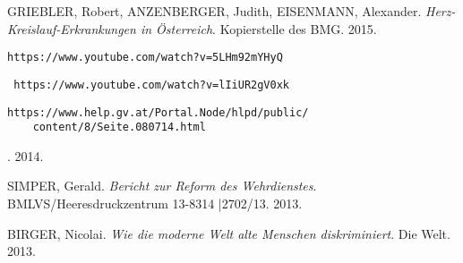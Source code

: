 \documentclass[journal]{IEEEtran}
\begin{document}
\begin{thebibliography}{1}
    GRIEBLER, Robert, ANZENBERGER, Judith, EISENMANN, Alexander.
    \emph{Herz-Kreislauf-Erkrankungen in Österreich}. Kopierstelle des BMG. 2015.

     \begin{verbatim}https://www.youtube.com/watch?v=5LHm92mYHyQ \end{verbatim}
    
    \begin{verbatim} https://www.youtube.com/watch?v=lIiUR2gV0xk \end{verbatim}
    
    \begin{verbatim}https://www.help.gv.at/Portal.Node/hlpd/public/
    content/8/Seite.080714.html\end{verbatim}. 2014.
    
    SIMPER, Gerald. \emph{Bericht zur Reform des Wehrdienstes}. BMLVS/Heeresdruckzentrum 13-8314 |2702/13. 2013.

    BIRGER, Nicolai. \emph{Wie die moderne Welt alte Menschen diskriminiert}. Die Welt. 2013.
    
\end{thebibliography}
\end{document}
